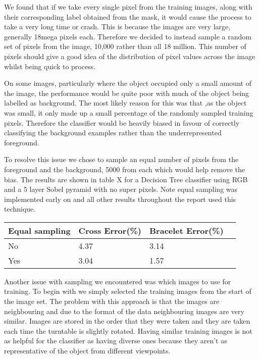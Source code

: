 \documentclass[12pt]{IIBproject}
\begin{document}
We found that if we take every single pixel from the training images, along with their corresponding label obtained from the mask, it would cause the process to take a very long time or crash. This is because the images are very large, generally 18mega pixels each. Therefore we decided to instead sample a random set of pixels from the image, 10,000 rather than all 18 million. This number of pixels should give a good idea of the distribution of pixel values across the image whilst being quick to process. 

On some images, particularly where the object occupied only a small amount of the image, the performance would be quite poor with much of the object being labelled as background. The most likely reason for this was that ,as the object was small, it only made up a small percentage of the randomly sampled training pixels. Therefore the classifier would be heavily biased in favour of correctly classifying the background examples rather than the underrepresented foreground.

 To resolve this issue we chose to sample an equal number of pixels from the foreground and the background, 5000 from each which would help remove the bias. The results are shown in table X for a Decision Tree classifier using RGB and a 5 layer Sobel pyramid with no super pixels. Note equal sampling  was implemented early on and all other results throughout the report used this technique.
 \begin{center}
    \begin{tabular}{ | l | l | l | p{5cm} |}
    \hline
    Equal sampling & Cross Error(\%) & Bracelet Error(\%) \\ \hline
    No & 4.37 & 3.14 \\ \hline
    Yes & 3.04 & 1.57 \\
    \hline
    
    \end{tabular}
    
\end{center}
  
 
Another issue with sampling we encountered was which images to use for training. To begin with we simply selected the training images from the start of the image set. The problem with this approach is that the images are neighbouring and due to the format of the data neighbouring images are very similar. Images are stored in the order that they were taken and they are taken each time the turntable is slightly rotated. Having similar training images is not as helpful for the classifier as having diverse ones because they aren't as representative of the object from different viewpoints. 
\end{document}

